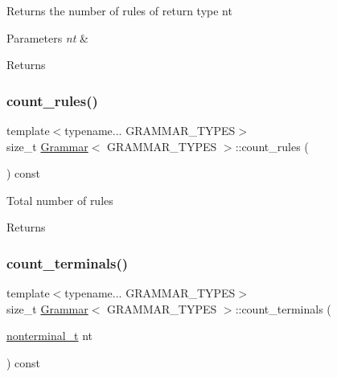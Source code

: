 Returns the number of rules of return type nt 
\begin{DoxyParams}{Parameters}
{\em nt} & \\
\hline
\end{DoxyParams}
\begin{DoxyReturn}{Returns}

\end{DoxyReturn}
\mbox{\label{class_grammar_a576605ca6ee9693b762a40c477aa4889}} 
\subsubsection{\texorpdfstring{count\+\_\+rules()}{count\_rules()}\hspace{0.1cm}{\footnotesize\ttfamily [2/2]}}
{\footnotesize\ttfamily template$<$typename... G\+R\+A\+M\+M\+A\+R\+\_\+\+T\+Y\+P\+ES$>$ \\
size\+\_\+t \hyperlink{class_grammar}{Grammar}$<$ G\+R\+A\+M\+M\+A\+R\+\_\+\+T\+Y\+P\+ES $>$\+::count\+\_\+rules (\begin{DoxyParamCaption}{ }\end{DoxyParamCaption}) const\hspace{0.3cm}{\ttfamily [inline]}}

Total number of rules \begin{DoxyReturn}{Returns}

\end{DoxyReturn}
\mbox{\label{class_grammar_a5121201035b5d5cd0a1d4251b1f73056}} 
\subsubsection{\texorpdfstring{count\+\_\+terminals()}{count\_terminals()}}
{\footnotesize\ttfamily template$<$typename... G\+R\+A\+M\+M\+A\+R\+\_\+\+T\+Y\+P\+ES$>$ \\
size\+\_\+t \hyperlink{class_grammar}{Grammar}$<$ G\+R\+A\+M\+M\+A\+R\+\_\+\+T\+Y\+P\+ES $>$\+::count\+\_\+terminals (\begin{DoxyParamCaption}\item[{\hyperlink{_nonterminal_8h_a5c1f658dc7560600a16d22408bd716ca}{nonterminal\+\_\+t}}]{nt }\end{DoxyParamCaption}) const\hspace{0.3cm}{\ttfamily [inline]}}

